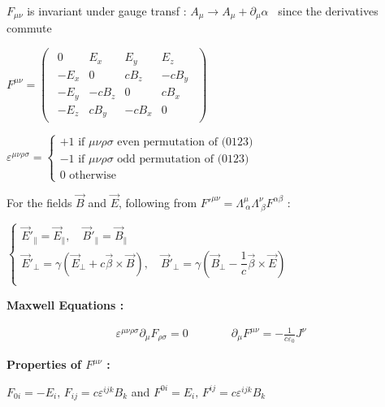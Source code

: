 \item $F_{\mu\nu}$ is invariant under gauge transf : $A_{\mu} \rightarrow A_{\mu} + \partial_{\mu}\alpha $ \, since the derivatives commute

\item $F^{\mu\nu}=\begin{pmatrix}
\begin{array}{cccc}
0 & E_x & E_y & E_z \\ 
-E_x & 0 & c B_z & -c B_y \\ 
-E_y & -cB_z  & 0 & c B_x \\ 
-E_z &  cB_y& -cB_x & 0
\end{array} 
\end{pmatrix}$

\item $\varepsilon^{\mu\nu\rho\sigma} = 
\begin{cases}
+1 \, \, \text{if $\mu\nu\rho\sigma$ even permutation of (0123)}  \\
-1 \, \, \text{if $\mu\nu\rho\sigma$ odd permutation of (0123)} \\
0 \, \, \text{otherwise}	
\end{cases}$
\item For the fields $\vec{B}$ and $\vec{E}$, following from $F'^{\mu\nu}=\Lambda^\mu_{\ \alpha}\Lambda^\nu_{\ \beta} F^{\alpha\beta}$ : 
\item $\begin{cases}
\vec{E}'_{\parallel} = \vec{E}_{\parallel}, \quad \vec{B}'_{\parallel} = \vec{B}_{\parallel} \\
\vec{E}'_{\perp} = \gamma(\vec{E}_{\perp} + c \vec{\beta}\times \vec{B}), \quad \vec{B}'_{\perp} = \gamma(\vec{B}_{\perp} - \dfrac{1}{c}\vec{\beta} \times \vec{E} )\\
\end{cases}$
\item[] \textbf{Maxwell Equations :}

$$\boxed{\begin{split}
	\varepsilon^{\mu \nu \rho \sigma}\partial_\mu F_{\rho \sigma}=0  \qquad \quad & \partial_\mu F^{\mu\nu}=-\frac{1}{c\varepsilon_0}J^\nu 
	\end{split}}$$

\item \textbf{Properties of $F^{\mu\nu} $ :} 

\item $F_{0i} = -E_i, \,  F_{ij} =  c \varepsilon^{ijk}B_k$ and $F^{0i} = E_i, \, F^{ij} = c\varepsilon^{ijk}B_k$

